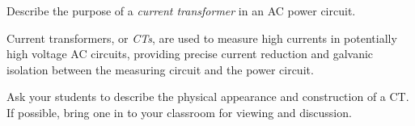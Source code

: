 

Describe the purpose of a {\it current transformer} in an AC power circuit.







Current transformers, or {\it CTs}, are used to measure high currents in potentially high voltage AC circuits, providing precise current reduction and galvanic isolation between the measuring circuit and the power circuit.







Ask your students to describe the physical appearance and construction of a CT.  If possible, bring one in to your classroom for viewing and discussion.




